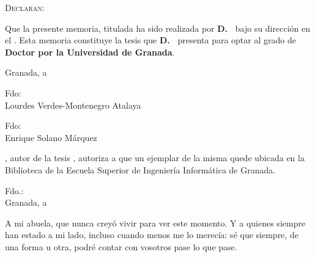 	\vspace{2cm}

	\begin{adjustwidth}{2cm}{0cm}
		\noindent \textsc{Declaran:\\}
	
		\vspace{0.5cm}
		
		\noindent Que la presente memoria, titulada
		\emph{\thesistitle} ha sido realizada por
		\textbf{D.~\thesisauthor} bajo su dirección en el \IAA.
		Esta memoria constituye la tesis que
		\textbf{D.~\thesisauthor} presenta para optar al grado de
		\textbf{Doctor por la Universidad de Granada}.
		
		\begin{flushright}
			Granada, a \fechaDeposito\\
		\end{flushright}
	\end{adjustwidth}
	
	\vspace{3cm}
	
	\begin{minipage}{6.5cm}
		\begin{center}
			{\small Fdo:\\
			Lourdes Verdes-Montenegro Atalaya}
		\end{center}
	\end{minipage}
	\begin{minipage}{6.5cm}
		\begin{center}
			{\small Fdo:\\
			Enrique Solano Márquez}
		\end{center}
	\end{minipage}
	
	\cleardoublepage
	
	\vspace{5cm}
	\noindent \textbf{\thesisauthor},  autor de la tesis  
	\emph{\thesistitle}, autoriza a que un ejemplar de la misma
	quede ubicada en la Biblioteca de la Escuela Superior de
	Ingeniería Informática de Granada.
	\vspace{5cm}
	\begin{center}
		Fdo.:~\thesisauthor\\
		Granada, a \fechaDeposito
	\end{center}
	
	\cleardoublepage
	
	\vspace{5cm}
	\begin{adjustwidth}{0.6\textwidth}{0cm}
		\begin{flushright}
			A mi abuela, que nunca creyó vivir para ver este momento. 
			Y a quienes siempre han estado a mi lado, incluso cuando 
			menos me lo merecía: sé que siempre, de una forma u otra, 
			podré contar con vosotros pase lo que pase.
		\end{flushright}
	\end{adjustwidth}

